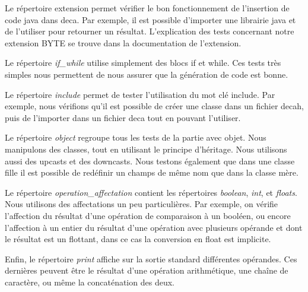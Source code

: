 \documentclass[12pt, a4paper, one side]{article}
\begin{document}
\begin{flushleft}
Le répertoire extension permet vérifier le bon fonctionnement de l'insertion de code java dans deca. Par exemple, il est possible d'importer une librairie java et de l'utiliser pour retourner un résultat. L'explication des tests concernant notre extension BYTE se trouve dans la documentation de l'extension.
\end{flushleft}

\begin{flushleft}
Le répertoire \textit{if\_while} utilise simplement des blocs if et while. Ces tests très simples nous permettent de nous assurer que la génération de code est bonne.
\end{flushleft}

\begin{flushleft}
Le répertoire \textit{include} permet de tester l'utilisation du mot clé include. Par exemple, nous vérifions qu'il est possible de créer une classe dans un fichier decah, puis de l'importer dans un fichier deca tout en pouvant l'utiliser.
\end{flushleft}

\begin{flushleft}
Le répertoire \textit{object} regroupe tous les tests de la partie avec objet. Nous manipulons des classes, tout en utilisant le principe d'héritage. Nous utilisons aussi des upcasts et des downcasts. Nous testons également que dans une classe fille il est possible de redéfinir un champs de même nom que dans la classe mère.
\end{flushleft}

\begin{flushleft}
Le répertoire \textit{operation\_affectation} contient les répertoires \textit{boolean}, \textit{int}, et \textit{floats}. Nous utilisons des affectations un peu particulières. Par exemple, on vérifie l'affection du résultat d'une opération de comparaison à un booléen, ou encore l'affection à un entier du résultat d'une opération avec plusieurs opérande et dont le résultat est un flottant, dans ce cas la conversion en float est implicite.
\end{flushleft}

\begin{flushleft}
Enfin, le répertoire \textit{print} affiche sur la sortie standard différentes opérandes. Ces dernières peuvent être le résultat d'une opération arithmétique, une chaîne de caractère, ou même la concaténation des deux.
\end{flushleft}
\end{document}

